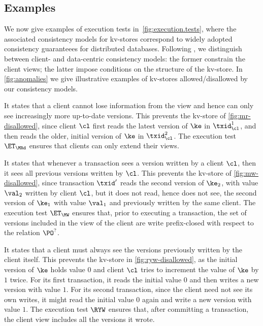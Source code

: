 \subsection{Examples}\label{subsec:cm_examples}

We now give examples of execution tests in~\cref{fig:execution.tests},
where the associated consistency models for kv-stores correspond to
widely adopted consistency guaranteees for distributed databases.
Following \cite{distrprinciples}, we distinguish between
client- and data-centric consistency models: 
the former constrain the client views; 
the latter impose conditions on the structure of the kv-store.  
In \cref{fig:anomalies} we give illustrative
examples of kv-stores allowed/disallowed by our
consistency models.

It states that a client cannot lose information from the view and 
hence can only see increasingly more up-to-date versions. 
This prevents \eg the kv-store of \cref{fig:mr-disallowed},
since client $\cl$ first reads the latest version of $\ke$ in $\txid_{\cl}^{1}$, 
and then reads the older, initial version of $\ke$ in $\txid_{\cl}^{2}$.  
The execution test $\ET_{\MRd}$ ensures that clients  can only extend their views. 

It states that whenever a transaction sees a version written by a client $\cl$,
then it sees all previous versions written by $\cl$. 
This prevents \eg the kv-store of \cref{fig:mw-disallowed}, since 
transaction $\txid'$ reads the second version of $\ke_2$, 
with value $\val_2$ written by client $\cl$, 
but it does not read, hence does not see, the second version of $\ke_1$
with value $\val_1$ and previously written by the same client.
The execution test $\ET_{\MW}$  ensures that, prior to executing a transaction,
the set of versions included in the view of the client are write 
prefix-closed with respect to the relation $\PO^?$.

It states that a client must always see the versions previously written by the client itself.
This prevents the kv-store in \cref{fig:ryw-disallowed}, 
as the initial version of $\ke$ holds value $0$ 
and client $\cl$ tries to increment the value of $\ke$ by $1$ twice.  
For its first transaction, it reads the initial value $0$ and then writes a new version with value $1$. 
For its second transaction, since the client need not see its own writes, 
it might read the initial value $0$ again and write a new version with value $1$.
The execution test $\RYW$ ensures that, after committing a transaction, 
the client view includes all the versions it wrote.  
 
